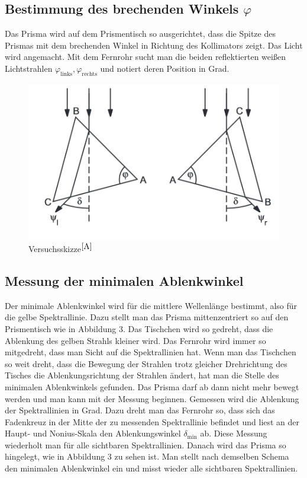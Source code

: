 \documentclass[fontsize=12pt]{scrartcl}
\begin{document}
\subsection{Bestimmung des brechenden Winkels $\varphi$}
Das Prisma wird auf dem Prismentisch so ausgerichtet, dass die Spitze des Prismas mit dem brechenden Winkel in Richtung des Kollimators zeigt. Das Licht wird angemacht. Mit dem Fernrohr sucht man die beiden reflektierten weißen Lichtstrahlen $\varphi_{\text{links}}, \varphi_{\text{rechts}}$ und notiert deren Position in Grad.
\begin{figure}[h]
\centering
\includegraphics[scale=1]{Graphik/O20-4}
\caption{Versuchsskizze$^{\cite{A}}$}
\end{figure}
\newpage
\noindent
\subsection{Messung der minimalen Ablenkwinkel}
Der minimale Ablenkwinkel wird für die mittlere Wellenlänge bestimmt, also für die gelbe Spektrallinie. Dazu stellt man das Prisma mittenzentriert so auf den Prismentisch wie in Abbildung 3. Das Tischchen wird so gedreht, dass die Ablenkung des gelben Strahls kleiner wird. Das Fernrohr wird immer so mitgedreht, dass man Sicht auf die Spektrallinien hat. Wenn man das Tischchen so weit dreht, dass die Bewegung der Strahlen trotz gleicher Drehrichtung des Tisches die Ablenkungsrichtung der Strahlen ändert, hat man die Stelle des minimalen Ablenkwinkels gefunden. Das Prisma darf ab dann nicht mehr bewegt werden und man kann mit der Messung beginnen.
Gemessen wird die Ablenkung der Spektrallinien in Grad. Dazu dreht man das Fernrohr so, dass sich das Fadenkreuz in der Mitte der zu messenden Spektrallinie befindet und liest an der Haupt- und Nonius-Skala den Ablenkungswinkel $\delta_{\text{min}}$ ab. Diese Messung wiederholt man für alle sichtbaren Spektrallinien.
Danach wird das Prisma so hingelegt, wie in  Abbildung 3 zu sehen ist. Man stellt nach demselben Schema den minimalen Ablenkwinkel ein und misst wieder alle sichtbaren Spektrallinien.
\end{document}
